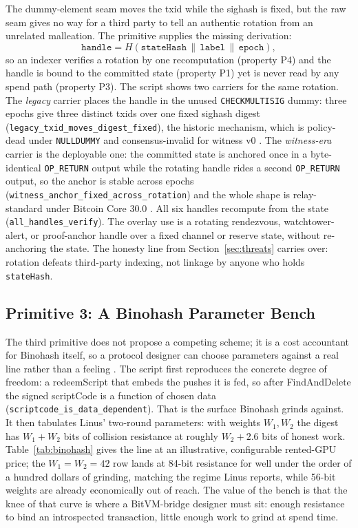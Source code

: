 \documentclass[11pt]{article}
\begin{document}
The dummy-element seam moves the txid while the sighash is fixed, but the raw
seam gives no way for a third party to tell an authentic rotation from an
unrelated malleation. The primitive supplies the missing derivation:
\[
\texttt{handle} = H(\texttt{stateHash} \,\|\, \texttt{label} \,\|\, \texttt{epoch}),
\]
so an indexer verifies a rotation by one recomputation (property P4) and the
handle is bound to the committed state (property P1) yet is never read by any
spend path (property P3). The script shows two carriers for the same rotation.
The \emph{legacy} carrier places the handle in the unused
\texttt{CHECKMULTISIG} dummy: three epochs give three distinct txids over one
fixed sighash digest (\texttt{legacy\_txid\_moves\_digest\_fixed}), the historic
mechanism, which is policy-dead under \texttt{NULLDUMMY} and consensus-invalid
for witness v0 \cite{bip147}. The \emph{witness-era} carrier is the deployable
one: the committed state is anchored once in a byte-identical
\texttt{OP\_RETURN} output while the rotating handle rides a second
\texttt{OP\_RETURN} output, so the anchor is stable across epochs
(\texttt{witness\_anchor\_fixed\_across\_rotation}) and the whole shape is
relay-standard under Bitcoin Core 30.0 \cite{bitcoincore30}. All six handles
recompute from the state (\texttt{all\_handles\_verify}). The overlay use is a
rotating rendezvous, watchtower-alert, or proof-anchor handle over a fixed
channel or reserve state, without re-anchoring the state. The honesty line from
Section~\ref{sec:threats} carries over: rotation defeats third-party indexing,
not linkage by anyone who holds \texttt{stateHash}.

\subsection{Primitive 3: A Binohash Parameter Bench}

The third primitive does not propose a competing scheme; it is a cost
accountant for Binohash itself, so a protocol designer can choose parameters
against a real line rather than a feeling \cite{linus2026binohash}. The script
first reproduces the concrete degree of freedom: a redeemScript that embeds the
pushes it is fed, so after FindAndDelete the signed scriptCode is a function of
chosen data (\texttt{scriptcode\_is\_data\_dependent}). That is the surface
Binohash grinds against. It then tabulates Linus' two-round parameters: with
weights $W_1, W_2$ the digest has $W_1 + W_2$ bits of collision resistance at
roughly $W_2 + 2.6$ bits of honest work. Table~\ref{tab:binohash} gives the
line at an illustrative, configurable rented-GPU price; the
$W_1 = W_2 = 42$ row lands at 84-bit resistance for well under the order of a
hundred dollars of grinding, matching the regime Linus reports, while 56-bit
weights are already economically out of reach. The value of the bench is that
the knee of that curve is where a BitVM-bridge designer must sit: enough
resistance to bind an introspected transaction, little enough work to grind at
spend time.
\end{document}
